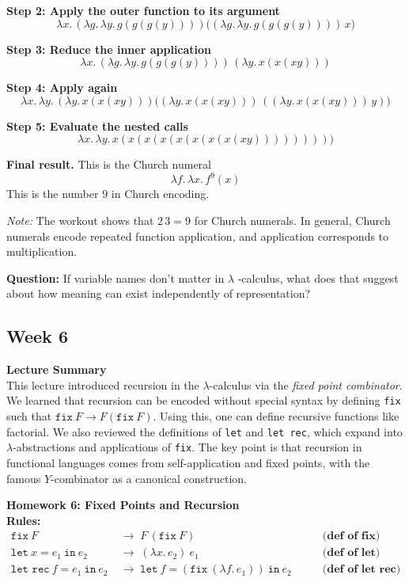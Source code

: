 \documentclass{article}
\theoremstyle{plain}
\theoremstyle{definition}
\theoremstyle{remark}
\begin{document}
\noindent
\textbf{Step 2: Apply the outer function to its argument}
\[
\lambda x.\, (\lambda g.\,\lambda y.\, g(g(g(y)))) \big( (\lambda g.\,\lambda y.\, g(g(g(y))))\, x \big)
\]

\noindent
\textbf{Step 3: Reduce the inner application}
\[
\lambda x.\, (\lambda g.\,\lambda y.\, g(g(g(y)))) \, (\lambda y.\, x(x(xy)))
\]

\noindent
\textbf{Step 4: Apply again}
\[
\lambda x.\,\lambda y.\, (\lambda y.\, x(x(xy))) \big((\lambda y.\, x(x(xy))) \, ((\lambda y.\, x(x(xy)))\, y)\big)
\]

\noindent
\textbf{Step 5: Evaluate the nested calls}
\[
\lambda x.\,\lambda y.\, x(x(x(x(x(x(x(x(xy)))))))))
\]

\noindent
\textbf{Final result.} This is the Church numeral
\[
\lambda f.\,\lambda x.\, f^9(x)
\]
This is the number $9$ in Church encoding.

\medskip
\noindent
\emph{Note:} The workout shows that $2\,3 = 9$ for Church numerals. In general, Church numerals encode repeated function application, and application corresponds to multiplication.

\textbf{Question:} If variable names don’t matter in $\lambda$
-calculus, what does that suggest about how meaning can exist independently of representation?

\subsection{Week 6}

\textbf{Lecture Summary}\\  
This lecture introduced recursion in the $\lambda$-calculus via the \textit{fixed point combinator}. We learned that recursion can be encoded without special syntax by defining \texttt{fix} such that $\texttt{fix}\ F \to F(\texttt{fix}\ F)$. Using this, one can define recursive functions like factorial. We also reviewed the definitions of \texttt{let} and \texttt{let rec}, which expand into $\lambda$-abstractions and applications of \texttt{fix}. The key point is that recursion in functional languages comes from self-application and fixed points, with the famous $Y$-combinator as a canonical construction.

\textbf{Homework 6: Fixed Points and Recursion}\\

\textbf{Rules:}\\
\[
\begin{aligned}
\texttt{fix}\ F &\;\to\; F\,(\texttt{fix}\ F) \qquad &\textbf{(def of fix)}\\
\texttt{let}\ x=e_1\ \texttt{in}\ e_2 &\;\to\; (\lambda x.\,e_2)\ e_1 \qquad &\textbf{(def of let)}\\
\texttt{let rec}\ f=e_1\ \texttt{in}\ e_2 &\;\to\; \texttt{let}\ f=(\texttt{fix}\ (\lambda f.\,e_1))\ \texttt{in}\ e_2 \qquad &\textbf{(def of let rec)}
\end{aligned}
\]
\end{document}
